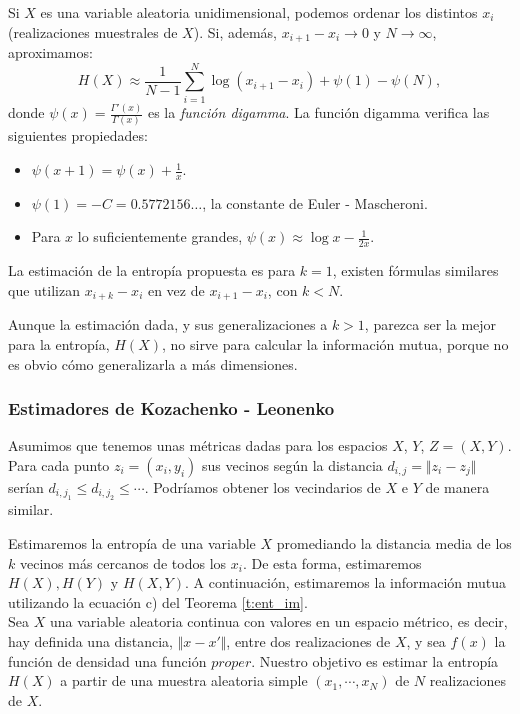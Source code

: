 \documentclass[10pt,a4paper]{article} %
\theoremstyle{definition}
\begin{document}
Si $X$ es una variable aleatoria unidimensional, podemos ordenar los distintos $x_i$ (realizaciones muestrales de $X$). Si, además, $x_{i+1} -x_i \to 0$ y $N\to \infty$, aproximamos:\[
H(X)\approx \frac{1}{N-1}\sum_{i=1}^N \log(x_{i+1}-x_i) + \psi(1) - \psi(N),\]
donde $\psi(x) = \frac{\Gamma'(x)}{\Gamma(x)}$ es la \textit{función digamma}. La función digamma verifica las siguientes propiedades:
\begin{itemize}
\item $\psi(x+1) = \psi(x) + \frac{1}{x}$.
\item $\psi(1) = -C = 0.5772156\dots$, la constante de Euler - Mascheroni.
  \item Para $x$ lo suficientemente grandes, $\psi(x) \approx \log x - \frac{1}{2x}$.
\end{itemize}

La estimación de la entropía propuesta es para $k=1$, existen fórmulas similares que utilizan $x_{i+k}-x_i$  en vez de $x_{i+1}-x_i$, con $k < N$.

Aunque la estimación dada, y sus generalizaciones a $k>1$, parezca ser la mejor para la entropía, $H(X)$, no sirve para calcular la información mutua, porque no es obvio cómo generalizarla a más dimensiones.

\subsubsection{Estimadores de Kozachenko - Leonenko}

Asumimos que tenemos unas métricas dadas para los espacios $X$, $Y$, $Z = (X,Y)$. Para cada punto $z_i = (x_i, y_i)$ sus vecinos según la distancia $d_{i,j}=\Vert z_i-z_j \Vert$ serían $d_{i,j_1} \leq d_{i,j_2} \leq \cdots$. Podríamos obtener los vecindarios de $X$ e $Y$ de manera similar.

Estimaremos la entropía de una variable $X$ promediando la distancia media de los $k$ vecinos más cercanos de todos los $x_i$. De esta forma, estimaremos $H(X), H(Y)$ y $H(X,Y)$. A continuación, estimaremos la información mutua utilizando la ecuación c) del Teorema \ref{t:ent_im}.\\

Sea $X$ una variable aleatoria continua con valores en un espacio métrico, es decir, hay definida una distancia, $\Vert x - x'\Vert$, entre dos realizaciones de $X$, y sea $f(x)$ la función de densidad una función $proper$. Nuestro objetivo es estimar la entropía $H(X)$ a partir de una muestra aleatoria simple $(x_1,\cdots,x_N)$ de $N$ realizaciones de $X$.
\end{document}
